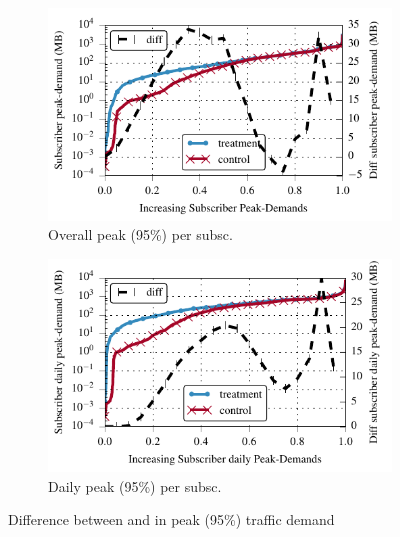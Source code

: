  
\begin{figure}[t]
\begin{minipage}{1\linewidth}
\centering
%
\begin{subfigure}[b]{.99\linewidth}
\includegraphics[width=\linewidth]{figures/diff_perc95_bytes_subsc-all.pdf}
               \caption{Overall peak (95\%) per subsc.\label{fig:diff-peak-overall}}
\end{subfigure}
%
\begin{subfigure}[b]{.99\linewidth}
\includegraphics[width=\linewidth]{figures/diff_perc95_bytes_subsc-daily-all.pdf}
               \caption{Daily peak (95\%) per subsc.\label{fig:diff-peak-daily}}
\end{subfigure}
%
\end{minipage}
\caption{Difference between \treatment{} and \control{}
               in peak (95\%) traffic demand\label{fig:diff-peak}}
\end{figure}


